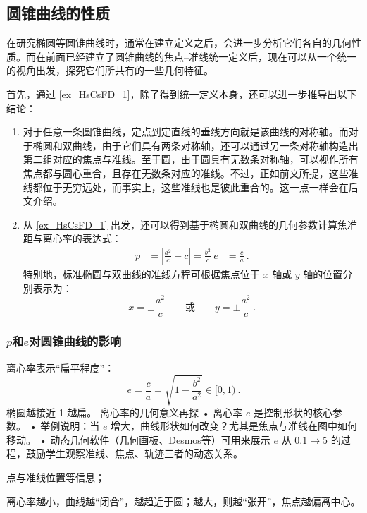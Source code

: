 \subsection{圆锥曲线的性质}

在研究椭圆等圆锥曲线时，通常在建立定义之后，会进一步分析它们各自的几何性质。而在前面已经建立了圆锥曲线的焦点–准线统一定义后，现在可以从一个统一的视角出发，探究它们所共有的一些几何特征。

首先，通过 \autoref{ex_HsCsFD_1}，除了得到统一定义本身，还可以进一步推导出以下结论：
\begin{enumerate}
\item 对于任意一条圆锥曲线，定点到定直线的垂线方向就是该曲线的对称轴。而对于椭圆和双曲线，由于它们具有两条对称轴，还可以通过另一条对称轴构造出第二组对应的焦点与准线。至于圆，由于圆具有无数条对称轴，可以视作所有焦点都与圆心重合，且存在无数条对应的准线。不过，正如前文所提，这些准线都位于无穷远处，而事实上，这些准线也是彼此重合的。这一点一样会在后文介绍。
\item 从 \autoref{ex_HsCsFD_1} 出发，还可以得到基于椭圆和双曲线的几何参数计算焦准距与离心率的表达式：
\begin{equation}
\begin{split}
p &= \left| \frac{a^2}{c} - c \right| = \frac{b^2}{c}\
e &= \frac{c}{a}~.
\end{split}
\end{equation}
特别地，标准椭圆与双曲线的准线方程可根据焦点位于 $x$ 轴或 $y$ 轴的位置分别表示为：
\begin{equation}
x = \pm\frac{a^2}{c} \qquad \text{或} \qquad y = \pm\frac{a^2}{c}~.
\end{equation}
\end{enumerate}

\subsubsection{$p$和$e$对圆锥曲线的影响}

离心率表示“扁平程度”：
$$ e = \frac{c}{a} = \sqrt{1 - \frac{b^2}{a^2}} \in [0, 1) ~.$$
椭圆越接近 1 越扁。
离心率的几何意义再探
	•	离心率 $e$ 是控制形状的核心参数。
	•	举例说明：当 $e$ 增大，曲线形状如何改变？尤其是焦点与准线在图中如何移动。
	•	动态几何软件（几何画板、Desmos等）可用来展示 $e$ 从 $0.1 \to 5$ 的过程，鼓励学生观察准线、焦点、轨迹三者的动态关系。

点与准线位置等信息；

离心率越小，曲线越“闭合”，越趋近于圆；越大，则越“张开”，焦点越偏离中心。


